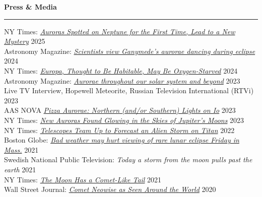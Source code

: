 \documentclass[12pt]{report}
\begin{document}
\noindent\bf{Press \& Media}\rm \hspace*{\fill} \\
\rule{\textwidth}{1pt}
\noindent NY Times: \href{https://www.nytimes.com/2025/03/26/science/neptune-aurora-nasa-webb-telescope.html}{{\it Auroras Spotted on Neptune for the First Time, Lead to a New Mystery}} \hfill 2025\\
\noindent Astronomy Magazine: \href{https://www.astronomy.com/science/scientists-view-ganymedes-aurorae-dancing-during-eclipse/}{{\it Scientists view Ganymede’s aurorae dancing during eclipse}} \hfill 2024\\
\noindent NY Times: \href{https://www.nytimes.com/2024/03/04/science/europa-moon-oxygen.html}{{\it Europa, Thought to Be Habitable, May Be Oxygen-Starved}} \hfill 2024\\
\noindent Astronomy Magazine: \href{https://www.astronomy.com/science/aurorae-throughout-our-solar-system-and-beyond}{{\it Aurorae throughout our solar system and beyond}} \hfill 2023\\
\noindent Live TV Interview, Hopewell Meteorite, Russian Television International (RTVi) \hfill 2023\\
\noindent AAS NOVA \href{https://aasnova.org/2023/07/25/pizza-aurorae-northern-and-or-southern-lights-on-io/}{{\it Pizza Aurorae: Northern (and/or Southern) Lights on Io}} \hfill 2023\\
\noindent NY Times: \href{https://www.nytimes.com/2023/02/16/science/auroras-jupiter-moons.html}{{\it New Auroras Found Glowing in the Skies of Jupiter’s Moons}} \hfill 2023\\
\noindent NY Times: \href{https://www.nytimes.com/2022/12/05/science/titan-webb-telescope-pictures.html}{{\it Telescopes Team Up to Forecast an Alien Storm on Titan}} \hfill 2022\\
\noindent Boston Globe: \href{https://www.bostonglobe.com/2021/11/18/metro/bad-weather-may-hurt-viewing-rare-lunar-eclipse-early-friday-mass/}{{\it Bad weather may hurt viewing of rare lunar eclipse Friday in Mass.}} \hfill 2021\\
\noindent Swedish National Public Television: {\it Today a storm from the moon pulls past the earth} \hfill 2021\\
\noindent NY Times: \href{https://www.nytimes.com/2021/03/04/science/moon-tail-beam.html}{{\it The Moon Has a Comet-Like Tail}} \hfill 2021\\
\noindent Wall Street Journal: \href{https://www.wsj.com/articles/comet-neowise-as-seen-around-the-world-11595368898}{{\it Comet Neowise as Seen Around the World}} \hfill 2020\\
\end{document}
